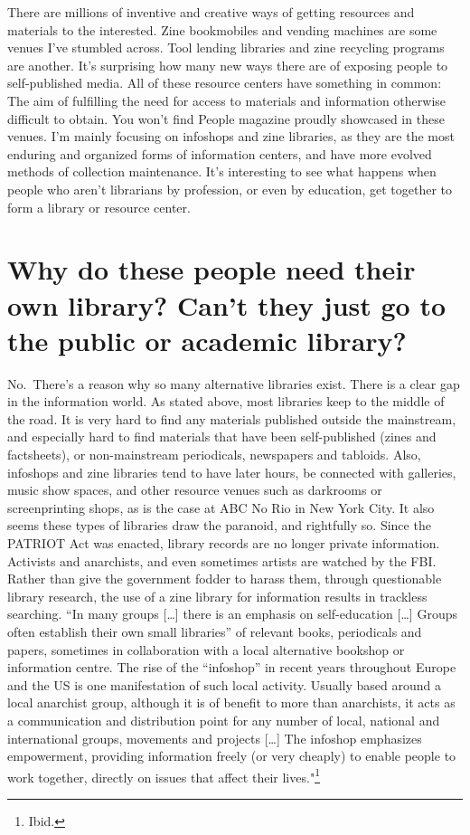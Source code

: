 \documentclass[output=paper]{langscibook}
\begin{document}
There are millions of inventive and creative ways of getting resources
and materials to the interested. Zine bookmobiles and vending machines
are some venues I've stumbled across. Tool lending libraries and zine
recycling programs are another. It's surprising how many new ways there
are of exposing people to self-published media. All of these resource
centers have something in common: The aim of fulfilling the need for
access to materials and information otherwise difficult to obtain. You
won't find People magazine proudly showcased in these venues. I'm mainly
focusing on infoshops and zine libraries, as they are the most enduring
and organized forms of information centers, and have more evolved
methods of collection maintenance. It's interesting to see what happens
when people who aren't librarians by profession, or even by education,
get together to form a library or resource center.

\hypertarget{why-do-these-people-need-their-own-library-cant-they-just-go-to-the-public-or-academic-library}{%
\section*{Why do these people need their own library? Can't they just go
to the public or academic
library?}\label{why-do-these-people-need-their-own-library-cant-they-just-go-to-the-public-or-academic-library}}

No.~There's a reason why so many alternative libraries exist. There is a
clear gap in the information world. As stated above, most libraries keep
to the middle of the road. It is very hard to find any materials
published outside the mainstream, and especially hard to find materials
that have been self-published (zines and factsheets), or non-mainstream
periodicals, newspapers and tabloids. Also, infoshops and zine libraries
tend to have later hours, be connected with galleries, music show
spaces, and other resource venues such as darkrooms or screenprinting
shops, as is the case at ABC No Rio in New York City. It also seems
these types of libraries draw the paranoid, and rightfully so. Since the
PATRIOT Act was enacted, library records are no longer private
information. Activists and anarchists, and even sometimes artists are
watched by the FBI. Rather than give the government fodder to harass
them, through questionable library research, the use of a zine library
for information results in trackless searching. \enquote{In many groups
{[}\ldots{]} there is an emphasis on self-education {[}\ldots{]} Groups
often establish their own small libraries} of relevant books,
periodicals and papers, sometimes in collaboration with a local
alternative bookshop or information centre. The rise of the
\enquote{infoshop} in recent years throughout Europe and the US is one
manifestation of such local activity. Usually based around a local
anarchist group, although it is of benefit to more than anarchists, it
acts as a communication and distribution point for any number of local,
national and international groups, movements and projects {[}\ldots{]}
The infoshop emphasizes empowerment, providing information freely (or
very cheaply) to enable people to work together, directly on issues that
affect their lives."\footnote{Ibid.}
\end{document}
